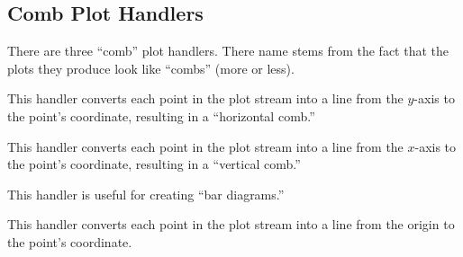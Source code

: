 \subsection{Comb Plot Handlers}

There are three ``comb'' plot handlers. There name stems from the fact
that the plots they produce look like ``combs'' (more or less).

\begin{command}{\pgfplothandlerxcomb}
  This handler converts each point in the plot stream into a line from
  the $y$-axis to the point's coordinate, resulting in a ``horizontal
  comb.''

  
\begin{codeexample}[]
\end{codeexample}
\end{command}


\begin{command}{\pgfplothandlerycomb}
  This handler converts each point in the plot stream into a line from
  the $x$-axis to the point's coordinate, resulting in a ``vertical
  comb.''
  
  This handler is useful for creating ``bar diagrams.''
\begin{codeexample}[]
\end{codeexample}
\end{command}

\begin{command}{\pgfplothandlerpolarcomb}
  This handler converts each point in the plot stream into a line from
  the origin to the point's coordinate.
  
\begin{codeexample}[]
\end{codeexample}
\end{command}

